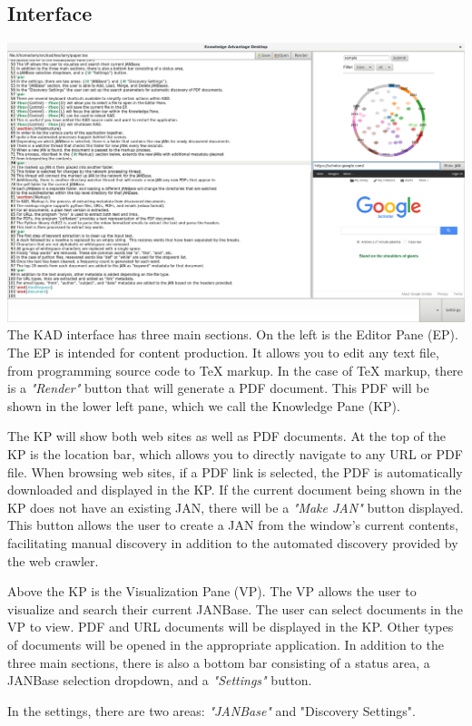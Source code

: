 \documentclass{article}
\begin{document}
\begin{doublespace}
\section{Interface}
\includegraphics[width=6in]{images/kad-overview.png}\\
The KAD interface has three main sections.
On the left is the Editor Pane (EP).
The EP is intended for content production.
It allows you to edit any text file, from programming source code to TeX markup.
In the case of TeX markup, there is a {\it "Render"} button that will generate a PDF document.
This PDF will be shown in the lower left pane, which we call the Knowledge Pane (KP).
\par
The KP will show both web sites as well as PDF documents.
At the top of the KP is the location bar, which allows you to directly navigate to any URL or PDF file.
When browsing web sites, if a PDF link is selected, the PDF is automatically downloaded and displayed
in the KP.
If the current document being shown in the KP does not have an existing JAN, there will be a
{\it "Make JAN"} button displayed.
This button allows the user to create a JAN from the window's current contents,
facilitating manual discovery in addition to the automated discovery provided by the web crawler.
\par
Above the KP is the Visualization Pane (VP).
The VP allows the user to visualize and search their current JANBase.
The user can select documents in the VP to view.
PDF and URL documents will be displayed in the KP.
Other types of documents will be opened in the appropriate application.
In addition to the three main sections, there is also a bottom bar consisting of a status area,
a JANBase selection dropdown, and a {\it "Settings"} button.
\par
In the settings, there are two areas: {\it "JANBase"} and {\lt "Discovery Settings"}.

\end{doublespace}
\end{document}

